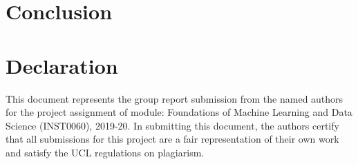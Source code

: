 \documentclass[11point]{article}
\begin{document}
\section{Conclusion}


\section*{Declaration}
This document represents the group report submission from the named authors for the project assignment of module: Foundations of Machine Learning and Data Science (INST0060), 2019-20. In submitting this document, the authors certify that all submissions for this project are a fair representation of their own work and satisfy the UCL regulations on  plagiarism.



\end{document}

